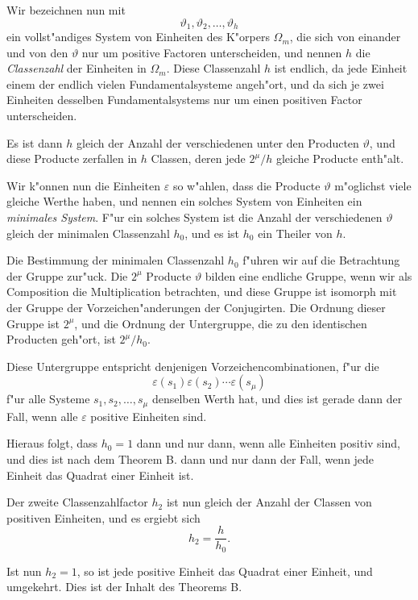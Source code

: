 \documentclass[10pt,a4paper]{article}
\theoremstyle{weberstyle}
\begin{document}
Wir bezeichnen nun mit
\[
\vartheta_1,\vartheta_2,\dots,\vartheta_h
\]
ein vollst"andiges System von Einheiten des K"orpers $\Omega_m$, die sich von
einander und von den $\vartheta$ nur um positive Factoren unterscheiden, und
nennen $h$ die \emph{Classenzahl} der Einheiten in $\Omega_m$. Diese
Classenzahl $h$ ist endlich, da jede Einheit einem der endlich vielen
Fundamentalsysteme angeh"ort, und da sich je zwei Einheiten desselben
Fundamentalsystems nur um einen positiven Factor unterscheiden.

Es ist dann $h$ gleich der Anzahl der verschiedenen unter den Producten
$\vartheta$, und diese Producte zerfallen in $h$ Classen, deren jede
$2^\mu/h$ gleiche Producte enth"alt.

Wir k"onnen nun die Einheiten $\varepsilon$ so w"ahlen, dass die Producte
$\vartheta$ m"oglichst viele gleiche Werthe haben, und nennen ein solches
System von Einheiten ein \emph{minimales System}. F"ur ein solches System
ist die Anzahl der verschiedenen $\vartheta$ gleich der minimalen
Classenzahl $h_0$, und es ist $h_0$ ein Theiler von $h$.

Die Bestimmung der minimalen Classenzahl $h_0$ f"uhren wir auf die
Betrachtung der Gruppe zur"uck. Die $2^\mu$ Producte $\vartheta$ bilden eine
endliche Gruppe, wenn wir als Composition die Multiplication betrachten,
und diese Gruppe ist isomorph mit der Gruppe der Vorzeichen"anderungen
der Conjugirten. Die Ordnung dieser Gruppe ist $2^\mu$, und die Ordnung
der Untergruppe, die zu den identischen Producten geh"ort, ist
$2^\mu/h_0$.

Diese Untergruppe entspricht denjenigen Vorzeichencombinationen, f"ur die
\[
\varepsilon(s_1)\varepsilon(s_2)\cdots\varepsilon(s_\mu)
\]
f"ur alle Systeme $s_1,s_2,\dots,s_\mu$ denselben Werth hat, und dies ist
gerade dann der Fall, wenn alle $\varepsilon$ positive Einheiten sind.

Hieraus folgt, dass $h_0=1$ dann und nur dann, wenn alle Einheiten
positiv sind, und dies ist nach dem Theorem B. dann und nur dann der
Fall, wenn jede Einheit das Quadrat einer Einheit ist.

Der zweite Classenzahlfactor $h_2$ ist nun gleich der Anzahl der
Classen von positiven Einheiten, und es ergiebt sich
\begin{equation}\label{eq:202.2}
h_2 = \frac{h}{h_0}.
\end{equation}

Ist nun $h_2=1$, so ist jede positive Einheit das Quadrat einer Einheit,
und umgekehrt. Dies ist der Inhalt des Theorems B.
\end{document}
